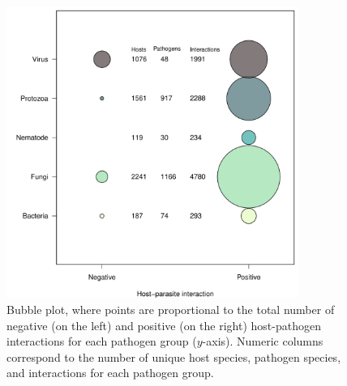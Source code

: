 \documentclass[12pt]{article}
\begin{document}
\begin{figure}[h!]
  \begin{center}
    \includegraphics[width=0.85\textwidth]{Figures/bubble.pdf}
    \caption{Bubble plot, where points are proportional to the total number of negative (on the left) and positive (on the right) host-pathogen interactions for each pathogen group ($y$-axis). Numeric columns correspond to the number of unique host species, pathogen species, and interactions for each pathogen group. }
    \label{fig:bubble}
  \end{center}
\end{figure}




\clearpage
\end{document}
